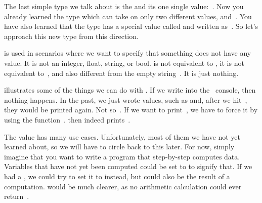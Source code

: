 %
\label{sec:none}%
%
%
%
%
The last simple type we talk about is the  and its one single value:~.
Now you already learned the type  which can take on only two different values,  and~.
You have also learned that the type  has a special value called  and written as~.
So let's approach this new type from this direction.

 is used in scenarios where we want to specify that something does not have any value.
It is not an integer, float, string, or bool.
 is not equivalent to , it is not equivalent to~, and also different from the empty string~\pythonIdx{\textquotedbl\textquotedbl}.
It is just nothing.

 illustrates some of the things we can do with .
If we write  into the \python\ console, then nothing happens.
In the past, we just wrote values, such as  and, after we hit~\keys{\enter}, they would be printed again.
Not so~.
If we want to print~, we have to force it by using the function~.
 then indeed prints~.

The value  has many use cases.
Unfortunately, most of them we have not yet learned about, so we will have to circle back to this later.
For now, simply imagine that you want to write a program that step-by-step computes data.
Variables that have not yet been computed could be set to  to signify that.
If we had a , we could try to set it to  instead, but  could also be the result of a computation.
 would be much clearer, as no arithmetic calculation could ever return~.

